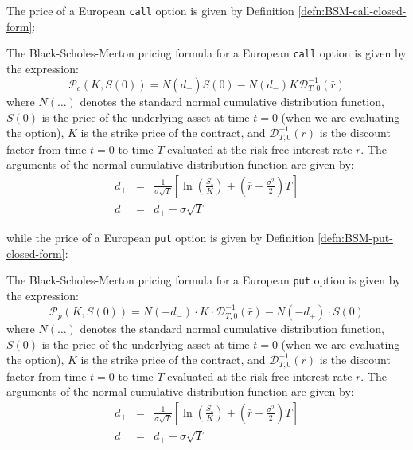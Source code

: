 \documentclass[11pt]{article}
\theoremstyle{definition}
\begin{document}
The price of a European \texttt{call} option is given by Definition \ref{defn:BSM-call-closed-form}:
\begin{definition}\label{defn:BSM-call-closed-form}
The Black-Scholes-Merton pricing formula for a European \texttt{call} option is given by the expression:
\begin{equation}
	\mathcal{P}_{c}(K,S(0)) = N(d_{+})S(0) - N(d_{-})K\mathcal{D}^{-1}_{T,0}(\bar{r})
\end{equation}
where $N(\dots)$ denotes the standard normal cumulative distribution function, $S(0)$ is the price of the underlying asset at time $t=0$ (when we are evaluating the option),
$K$ is the strike price of the contract, and $\mathcal{D}^{-1}_{T,0}(\bar{r})$ is the discount factor from time $t=0$ to time $T$ evaluated at the risk-free interest rate $\bar{r}$.
The arguments of the normal cumulative distribution function are given by:
\begin{eqnarray}
d_{+} & = & \frac{1}{\sigma\sqrt{T}}\left[\ln(\frac{S_{\circ}}{K}) + (\bar{r}+\frac{\sigma^{2}}{2})T\right] \\
d_{-} & = & d_{+} - \sigma\sqrt{T}
\end{eqnarray}
\end{definition}
while the price of a European \texttt{put} option is given by Definition \ref{defn:BSM-put-closed-form}:
\begin{definition}\label{defn:BSM-put-closed-form}
The Black-Scholes-Merton pricing formula for a European \texttt{put} option is given by the expression:
\begin{equation}
\mathcal{P}_{p}(K,S(0)) = N(-d_{-})\cdot{K}\cdot\mathcal{D}^{-1}_{T,0}(\bar{r}) - N(-d_{+})\cdot{S}(0)
\end{equation}
where $N(\dots)$ denotes the standard normal cumulative distribution function, 
$S(0)$ is the price of the underlying asset at time $t=0$ (when we are evaluating the option),
$K$ is the strike price of the contract, and $\mathcal{D}^{-1}_{T,0}(\bar{r})$ is the discount factor from time $t=0$ to time $T$ evaluated at the risk-free interest rate $\bar{r}$.
The arguments of the normal cumulative distribution function are given by:
\begin{eqnarray}
d_{+} & = & \frac{1}{\sigma\sqrt{T}}\left[\ln(\frac{S_{\circ}}{K}) + (\bar{r}+\frac{\sigma^{2}}{2})T\right] \\
d_{-} & = & d_{+} - \sigma\sqrt{T}
\end{eqnarray}
\end{definition}
\end{document}
